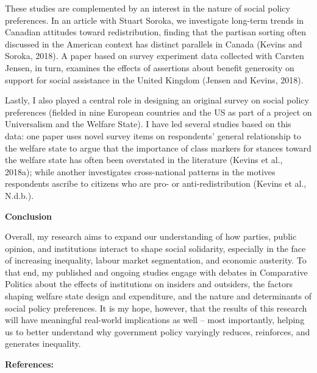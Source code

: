 \documentclass[letterpaper]{scrartcl}
\begin{document}
  These studies are complemented by an interest in the nature of social policy preferences. In an article with Stuart Soroka, we investigate long-term trends in Canadian attitudes toward redistribution, finding that the partisan sorting often discussed in the American context has distinct parallels in Canada (Kevins and Soroka, 2018). A paper based on survey experiment data collected with Carsten Jensen, in turn, examines the effects of assertions about benefit generosity on support for social assistance in the United Kingdom (Jensen and Kevins, 2018).

  Lastly, I also played a central role in designing an original survey on social policy preferences (fielded in nine European countries and the US as part of a project on Universalism and the Welfare State). I have led several studies based on this data: one paper uses novel survey items on respondents’ general relationship to the welfare state to argue that the importance of class markers for stances toward the welfare state has often been overstated in the literature (Kevins et al., 2018a); while another investigates cross-national patterns in the motives respondents ascribe to citizens who are pro- or anti-redistribution (Kevins et al., N.d.b.).

  \textbf{Conclusion}
  \vspace{-1em}

  Overall, my research aims to expand our understanding of how parties, public opinion, and institutions interact to shape social solidarity, especially in the face of increasing inequality, labour market segmentation, and economic austerity. To that end, my published and ongoing studies engage with debates in Comparative Politics about the effects of institutions on insiders and outsiders, the factors shaping welfare state design and expenditure, and the nature and determinants of social policy preferences. It is my hope, however, that the results of this research will have meaningful real-world implications as well -- most importantly, helping us to better understand why government policy varyingly reduces, reinforces, and generates inequality.

  \pagebreak

  \textbf{References:}
  \vspace{-1em}
\end{document}
